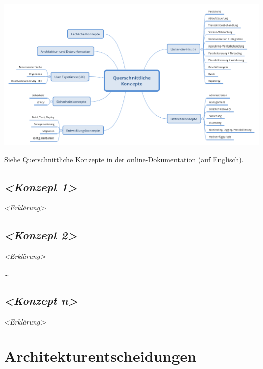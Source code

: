 \documentclass[
]{article}
\begin{document}
\includegraphics{images/08-Crosscutting-Concepts-Structure-DE.png}

Siehe \href{https://docs.arc42.org/section-8/}{Querschnittliche
Konzepte} in der online-Dokumentation (auf Englisch).

\hypertarget{__emphasis_konzept_1_emphasis}{%
\subsection{\texorpdfstring{\emph{\textless Konzept
1\textgreater{}}}{\textless Konzept 1\textgreater{}}}\label{__emphasis_konzept_1_emphasis}}

\emph{\textless Erklärung\textgreater{}}

\hypertarget{__emphasis_konzept_2_emphasis}{%
\subsection{\texorpdfstring{\emph{\textless Konzept
2\textgreater{}}}{\textless Konzept 2\textgreater{}}}\label{__emphasis_konzept_2_emphasis}}

\emph{\textless Erklärung\textgreater{}}

\ldots{}

\hypertarget{__emphasis_konzept_n_emphasis}{%
\subsection{\texorpdfstring{\emph{\textless Konzept
n\textgreater{}}}{\textless Konzept n\textgreater{}}}\label{__emphasis_konzept_n_emphasis}}

\emph{\textless Erklärung\textgreater{}}

\hypertarget{section-design-decisions}{%
\section{Architekturentscheidungen}\label{section-design-decisions}}
\end{document}

